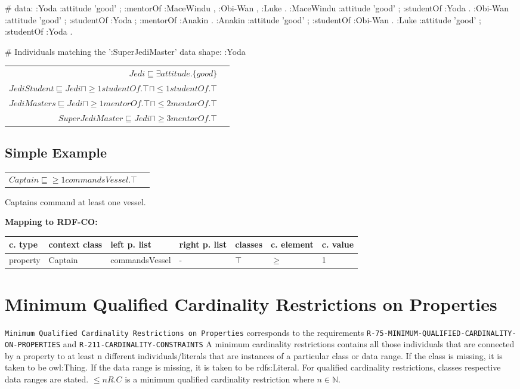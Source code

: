 \documentclass{llncs}
\newcommand{\ms}[1]{\texttt{#1}}
\newenvironment{gcotable}{
  \scriptsize
  \sffamily
  \vspace{0cm}
	\begin{center}
	\textbf{\vspace{0.4cm}Mapping to RDF-CO:} \\
  \begin{tabular}{l|l|l|l|l|l|l}
	\hline
  \textbf{c. type} & \textbf{context class} & \textbf{left p. list} & \textbf{right p. list} & \textbf{classes} & \textbf{c. element} & \textbf{c. value} \\
  \hline

}{
  \hline
  \end{tabular}
	\end{center}
}
\newenvironment{DL}{
  \vspace{0cm}
	\begin{center}
  \begin{tabular}{r l}

}{
  \end{tabular}
	\end{center}
}
\begin{document}
\begin{ex}
# data:
:Yoda 
    :attitude 'good' ;
    :mentorOf :MaceWindu , :Obi-Wan , :Luke .
:MaceWindu
    :attitude 'good' ;
    :studentOf :Yoda .
:Obi-Wan 
    :attitude 'good' ;
    :studentOf :Yoda ;
    :mentorOf :Anakin .
:Anakin
    :attitude 'good' ; 
    :studentOf :Obi-Wan .
:Luke
    :attitude 'good' ;
    :studentOf :Yoda .
\end{ex}

\begin{ex}
# Individuals matching the ’:SuperJediMaster’ data shape:
:Yoda 
\end{ex}

\begin{DL}
$Jedi \sqsubseteq \exists attitude.\{good\} $\\
$JediStudent \sqsubseteq Jedi \sqcap \geq1 studentOf.\top \sqcap \leq1 studentOf.\top$ \\
$JediMasters \sqsubseteq Jedi \sqcap \geq1 mentorOf.\top \sqcap \leq2 mentorOf.\top $\\
$SuperJediMaster \sqsubseteq Jedi \sqcap  \geq3 mentorOf.\top $
\end{DL}

\subsection{Simple Example}

\begin{DL}
$Captain \sqsubseteq \geq1 commandsVessel.\top $
\end{DL}

Captains command at least one vessel.

\begin{gcotable}
property & Captain & commandsVessel & - & $\top$ & $\geq$ & 1 \\
\end{gcotable}

\section{Minimum Qualified Cardinality Restrictions on Properties}

\ms{Minimum Qualified Cardinality Restrictions on Properties} corresponds to the requirements
\ms{R-75-MINIMUM-QUALIFIED-CARDINALITY-ON-PROPERTIES} and \ms{R-211-CARDINALITY-CONSTRAINTS}
A minimum cardinality restrictions contains all those individuals that are connected by a property to at least n different individuals/literals 
that are instances of a particular class or data range. If the class is missing, it is taken to be owl:Thing. 
If the data range is missing, it is taken to be rdfs:Literal.
For qualified cardinality restrictions, classes respective data ranges are stated.
$\leq n R. C$ is a minimum qualified cardinality restriction where $n \in \mathbb{N}$.
\end{document}
